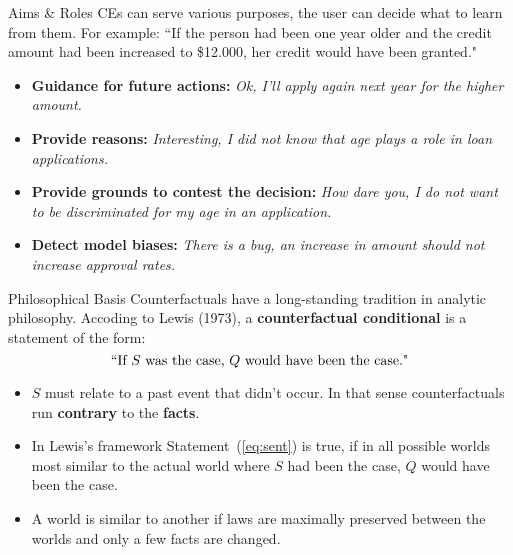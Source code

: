 \documentclass[11pt,compress,t,notes=noshow, aspectratio=169, xcolor=table]{beamer}
\begin{document}
\begin{vbframe}{Aims \& Roles}
	CEs can serve various purposes, the user can decide what to learn from them. For example:\newline
	``If the person had been one year older and the credit amount had been increased to \$12.000, her credit would have been granted."  \\[0.2cm]
	\begin{itemize}
		\itemsep1.3em
		\item \textbf{Guidance for future actions:} \textit{Ok, I'll apply again next year for the higher amount.}
		\item \textbf{Provide reasons:} \textit{Interesting, I did not know that age plays a role in loan applications.}
		\item \textbf{Provide grounds to contest the decision:} \textit{How dare you, I do not want to be discriminated for my age in an application.}
		\item \textbf{Detect model biases:} \textit{There is a bug, an increase in amount should not increase approval rates.}
	\end{itemize}
\end{vbframe}

\begin{vbframe}{Philosophical Basis}
Counterfactuals have a long-standing tradition in analytic philosophy. %
Accoding to Lewis (1973), a \textbf{counterfactual conditional} is a statement of the form:	
\begin{equation}
		\textnormal{``If $S$ was the case, $Q$ would have been the case."}
		\label{eq:sent}
\end{equation}
	\begin{itemize}
		\item $S$ must relate to a past event that didn't occur. In that sense counterfactuals run \textbf{contrary} to the \textbf{facts}.
		\item In Lewis's framework Statement~(\ref{eq:sent}) is true, if in all possible worlds most similar to the actual world where $S$ had been the case, $Q$ would have been the case. 
		\item A world is similar to another if laws are maximally preserved between the worlds and only a few facts are changed.
	\end{itemize}
\end{vbframe}
\end{document}
